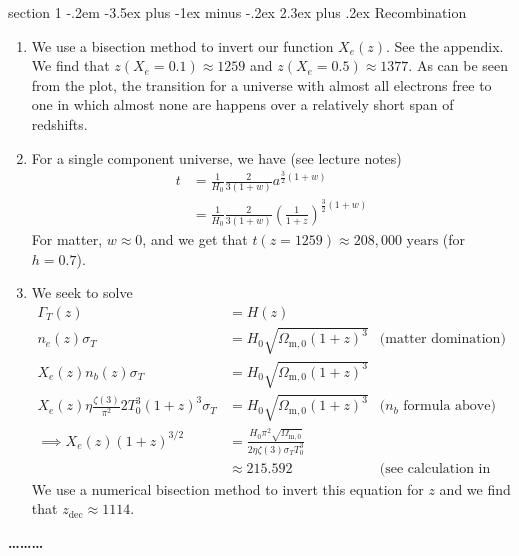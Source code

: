 \documentclass[12pt]{article}
\makeatletter
\newenvironment{problem}{\@startsection
	{section}
	{1}
	{-.2em}
	{-3.5ex plus -1ex minus -.2ex}
	{2.3ex plus .2ex}
	{\pagebreak[3]%
		\large\bf\noindent{Problem }
	}
}
{%
	\begin{center}\large\bf \ldots\ldots\ldots\end{center}}
\newcommand{\Omx}[1]{\ensuremath{\Omega_\mathrm{#1} } }
\makeatother
\begin{document}
\begin{problem}{Recombination}
\begin{enumerate}
			\begin{figure}
				\centering
			\end{figure}
			
			\item We use a bisection method to invert our function $X_e(z)$.  See the appendix.  We find that $\boxed{z(X_e = 0.1) \approx 1259}$ and $\boxed{z(X_e = 0.5) \approx 1377}$.  As can be seen from the plot, the transition for a universe with almost all electrons free to one in which almost none are happens over a relatively short span of redshifts.
			
			\item For a single component universe, we have (see lecture notes) \begin{align*}
				t &= \frac{1}{H_0}\frac{2}{3(1  + w)}a^{\frac{3}{2}(1+w)}
				\\
				&= \frac{1}{H_0}\frac{2}{3(1  + w)}\left(\frac{1}{1+z}\right)^{\frac{3}{2}(1+w)}
			\end{align*} For matter, $w\approx 0$, and we get that $\boxed{t(z=1259)\approx 208,000 \text{ years}}$ (for $h=0.7$).
			
			\item We seek to solve \begin{align*}
				\Gamma_T(z) &= H(z)
				\\
				n_e(z)\sigma_T &= H_0 \sqrt{\Omx{m,0}( 1 + z )^3} & \text{(matter domination)}
				\\
				X_e(z)n_b(z)\sigma_T &= H_0 \sqrt{\Omx{m,0}( 1 + z )^3}
				\\
				X_e(z) \eta \frac{\zeta(3)}{\pi^2}2 T_0^3 (1+z)^3\sigma_T &= H_0 \sqrt{\Omx{m,0}( 1 + z )^3} & \text{($n_b$ formula above)}
				\\
				\implies X_e(z) (1+z)^{3/2} &= \frac{H_0\pi^2\sqrt{\Omx{m,0}}}{2\eta\zeta(3)\sigma_TT_0^3}
				\\
				&\approx 215.592 & \text{(see calculation in appendix)}
			\end{align*} We use a numerical bisection method to invert this equation for $z$ and we find that $\boxed{z_\mathrm{dec} \approx 1114}$.\\
			

\end{enumerate}
\end{problem}
\end{document}
